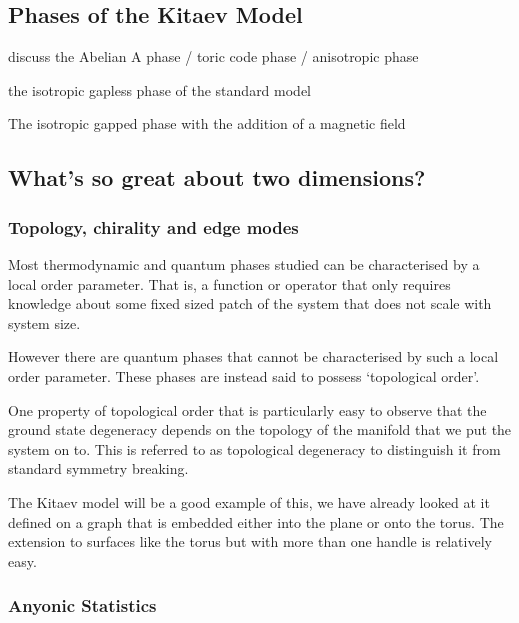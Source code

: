 \hypertarget{phases-of-the-kitaev-model}{%
\subsection{Phases of the Kitaev Model}\label{phases-of-the-kitaev-model}}

discuss the Abelian A phase / toric code phase / anisotropic phase

the isotropic gapless phase of the standard model

The isotropic gapped phase with the addition of a magnetic field

\hypertarget{whats-so-great-about-two-dimensions}{%
\subsection{What's so great about two dimensions?}\label{whats-so-great-about-two-dimensions}}

\hypertarget{topology-chirality-and-edge-modes}{%
\subsubsection{Topology, chirality and edge modes}\label{topology-chirality-and-edge-modes}}

Most thermodynamic and quantum phases studied can be characterised by a local order parameter. That is, a function or operator that only requires knowledge about some fixed sized patch of the system that does not scale with system size.

However there are quantum phases that cannot be characterised by such a local order parameter. These phases are instead said to possess `topological order'.

One property of topological order that is particularly easy to observe that the ground state degeneracy depends on the topology of the manifold that we put the system on to. This is referred to as topological degeneracy to distinguish it from standard symmetry breaking.

The Kitaev model will be a good example of this, we have already looked at it defined on a graph that is embedded either into the plane or onto the torus. The extension to surfaces like the torus but with more than one handle is relatively easy.

\hypertarget{anyonic-statistics}{%
\subsubsection{Anyonic Statistics}\label{anyonic-statistics}}


